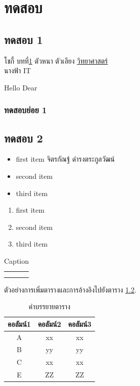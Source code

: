 \chapter{ทดสอบ}
\label{Ch:TEST}

\section{ทดสอบ 1}
โชกี้ บทที่\ref{Ch:TEST} {\boldfont ตัวหนา} {\italicfont ตัวเอียง} \underline{วิทยาศาสตร์} \\นางฟ้า IT

Hello Dear

\subsection{ทดสอบย่อย 1}

\section{ทดสอบ 2}
\begin{itemize}
    \item first item
    จิตรกัณฐ์ ดำรงตระกูลวัฒน์
    \item second item
    \item third item
\end{itemize}

\begin{enumerate}
    \item first item
    \item second item
    \item third item
\end{enumerate}

\begin{table}[]
    \centering
    \begin{tabular}{c|c}
         &  \\
         & 
    \end{tabular}
    \caption{Caption}
    \label{tab:placeholder}
\end{table}

\cite{parker2020}

ตัวอย่างการเพิ่มตารางและการอ้างอิงไปยังตาราง \ref{table:example_table}.

\begin{table}[h]
\centering
\begin{tabular}{|c c c|}
\hline
คอลัมน์1 & คอลัมน์2 & คอลัมน์3 \\ 
\hline
A & xx & xx \\ 
\hline
B & yy & yy \\ 
\hline
C & xx & xx  \\
E & ZZ & ZZ \\
\hline
\end{tabular}
\captionsetup{justification=centering, name=ตาราง}
\caption{คำบรรยายตาราง}
\label{table:example_table}
\end{table}

